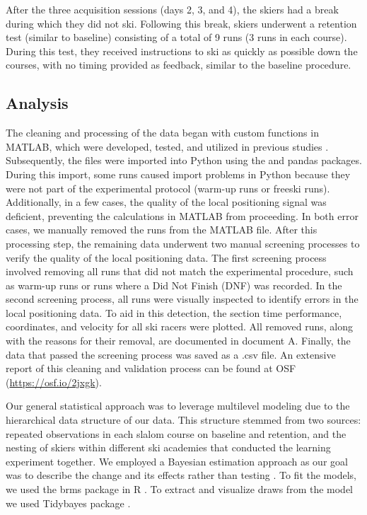 \documentclass{article}
\begin{document}
After the three acquisition sessions (days 2, 3, and 4), the skiers had a break during which they did not ski. Following this break, skiers underwent a retention test (similar to baseline) consisting of a total of 9 runs (3 runs in each course). During this test, they received instructions to ski as quickly as possible down the courses, with no timing provided as feedback, similar to the baseline procedure.


\subsection{Analysis}
The cleaning and processing of the data began with custom functions in MATLAB, which were developed, tested, and utilized in previous studies \cite{reidKinematicKineticStudy2010}. Subsequently, the files were imported into Python using the \cite{2020SciPy-NMeth} and pandas \cite{reback2020pandas} packages. During this import, some runs caused import problems in Python because they were not part of the experimental protocol (warm-up runs or freeski runs). Additionally, in a few cases, the quality of the local positioning signal was deficient, preventing the calculations in MATLAB from proceeding. In both error cases, we manually removed the runs from the MATLAB file. After this processing step, the remaining data underwent two manual screening processes to verify the quality of the local positioning data. The first screening process involved removing all runs that did not match the experimental procedure, such as warm-up runs or runs where a Did Not Finish (DNF) was recorded. In the second screening process, all runs were visually inspected to identify errors in the local positioning data. To aid in this detection, the section time performance, coordinates, and velocity for all ski racers were plotted. All removed runs, along with the reasons for their removal, are documented in document A. Finally, the data that passed the screening process was saved as a .csv file. An extensive report of this cleaning and validation process can be found at OSF  (\url{https://osf.io/2jxgk}).

Our general statistical approach was to leverage multilevel modeling due to the hierarchical data structure of our data. This structure stemmed from two sources: repeated observations in each slalom course on baseline and retention, and the nesting of skiers within different ski academies that conducted the learning experiment together. We employed a Bayesian estimation approach as our goal was to describe the change and its effects rather than testing \cite{kruschke_bayesian_2018}. To fit the models, we used the brms \cite{burkner_brms_2017} package in R \cite{r_core_team_r_2022}. To extract and visualize draws from the model we used Tidybayes package \cite{kay_tidybayes_nodate}. 
\end{document}
